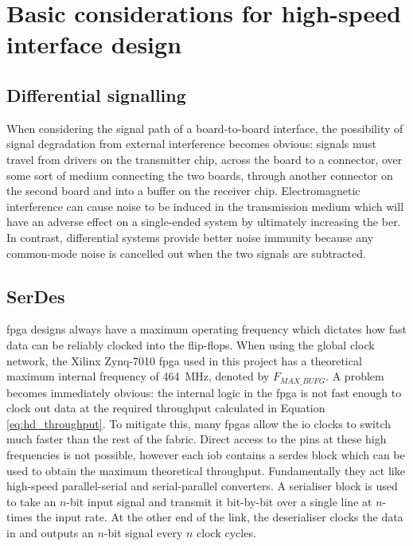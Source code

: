 
\section{Basic considerations for high-speed interface design}

\subsection{Differential signalling}

When considering the signal path of a board-to-board interface, the possibility of signal degradation from external interference becomes obvious: signals must travel from drivers on the transmitter chip, across the board to a connector, over some sort of medium connecting the two boards, through another connector on the second board and into a buffer on the receiver chip. Electromagnetic interference can cause noise to be induced in the transmission medium which will have an adverse effect on a single-ended system by ultimately increasing the \gls{ber}. In contrast, differential systems provide better noise immunity because any common-mode noise is cancelled out when the two signals are subtracted.


\subsection{SerDes}

\gls{fpga} designs always have a maximum operating frequency which dictates how fast data can be reliably clocked into the flip-flops. When using the global clock network, the Xilinx Zynq-7010 \gls{fpga} used in this project has a theoretical maximum internal frequency of \SI{464}{\mega\hertz}, denoted by \(F_{MAX\_BUFG}\)\cite{xilinx:ds187}. A problem becomes immediately obvious: the internal logic in the \gls{fpga} is not fast enough to clock out data at the required throughput calculated in Equation \ref{eq:hd_throughput}. To mitigate this, many \glspl{fpga} allow the \gls{io} clocks to switch much faster than the rest of the fabric. Direct access to the pins at these high frequencies is not possible, however each \gls{iob} contains a \gls{serdes} block which can be used to obtain the maximum theoretical throughput. Fundamentally they act like high-speed parallel-serial and serial-parallel converters. A \gls{serialiser} block is used to take an \(n\)-bit input signal and transmit it bit-by-bit over a single line at \(n\)-times the input rate. At the other end of the link, the deserialiser clocks the data in and outputs an \(n\)-bit signal every \(n\) clock cycles. 

